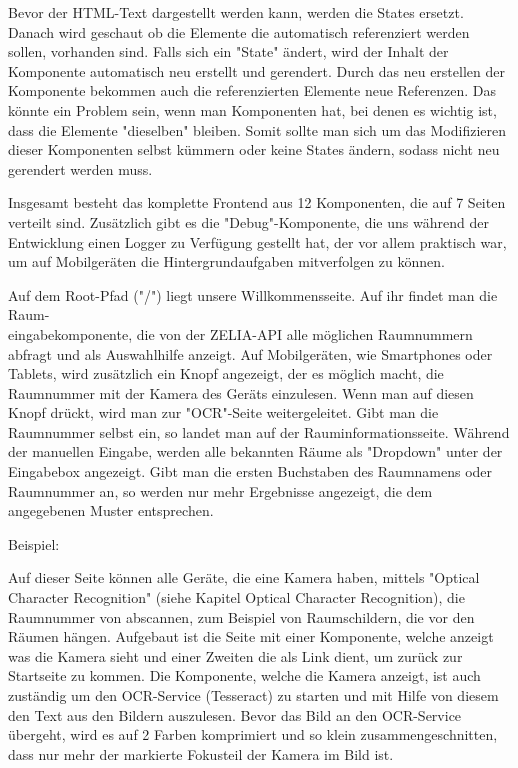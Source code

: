 Bevor der HTML-Text dargestellt werden kann, werden die States ersetzt. Danach wird geschaut ob die Elemente die automatisch referenziert werden sollen, vorhanden sind. Falls sich ein "State" ändert, wird der Inhalt der Komponente automatisch neu erstellt und gerendert. Durch das neu erstellen der Komponente bekommen auch die referenzierten Elemente neue Referenzen. Das könnte ein Problem sein, wenn man Komponenten hat, bei denen es wichtig ist, dass die Elemente "dieselben" bleiben. Somit sollte man sich um das Modifizieren dieser Komponenten selbst kümmern oder keine States ändern, sodass nicht neu gerendert werden muss.


Insgesamt besteht das komplette Frontend aus 12 Komponenten, die auf 7 Seiten verteilt sind. Zusätzlich gibt es die "Debug"-Komponente, die uns während der Entwicklung einen Logger zu Verfügung gestellt hat, der vor allem praktisch war, um auf Mobilgeräten die Hintergrundaufgaben mitverfolgen zu können.


Auf dem Root-Pfad ("/") liegt unsere Willkommensseite. Auf ihr findet man die Raum-\\eingabekomponente, die von der ZELIA-API alle möglichen Raumnummern abfragt und als Auswahlhilfe anzeigt. Auf Mobilgeräten, wie Smartphones oder Tablets, wird zusätzlich ein Knopf angezeigt, der es möglich macht, die Raumnummer mit der Kamera des Geräts einzulesen. Wenn man auf diesen Knopf drückt, wird man zur "OCR"-Seite weitergeleitet. Gibt man die Raumnummer selbst ein, so landet man auf der Rauminformationsseite. Während der manuellen Eingabe, werden alle bekannten Räume als "Dropdown" unter der Eingabebox angezeigt. Gibt man die ersten Buchstaben des Raumnamens oder Raumnummer an, so werden nur mehr Ergebnisse angezeigt, die dem angegebenen Muster entsprechen.

Beispiel:



Auf dieser Seite können alle Geräte, die eine Kamera haben, mittels "Optical Character Recognition" (siehe Kapitel Optical Character Recognition), die Raumnummer von abscannen, zum Beispiel von Raumschildern, die vor den Räumen hängen. Aufgebaut ist die Seite mit einer Komponente, welche anzeigt was die Kamera sieht und einer Zweiten die als Link dient, um zurück zur Startseite zu kommen. Die Komponente, welche die Kamera anzeigt, ist auch zuständig um den OCR-Service (Tesseract) zu starten und mit Hilfe von diesem den Text aus den Bildern auszulesen. Bevor das Bild an den OCR-Service übergeht, wird es auf 2 Farben komprimiert und so klein zusammengeschnitten, dass nur mehr der markierte Fokusteil der Kamera im Bild ist.

